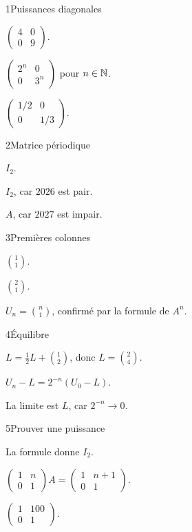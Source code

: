 \begin{corrige}{1}{Puissances diagonales}
\begin{questions}
\item $\begin{pmatrix}4&0\\0&9\end{pmatrix}$.
\item $\begin{pmatrix}2^n&0\\0&3^n\end{pmatrix}$ pour $n\in\mathbb{N}$.
\item $\begin{pmatrix}1/2&0\\0&1/3\end{pmatrix}$.
\end{questions}
\end{corrige}
\begin{corrige}{2}{Matrice périodique}
\begin{questions}
\item $I_2$.
\item $I_2$, car $2026$ est pair.
\item $A$, car $2027$ est impair.
\end{questions}
\end{corrige}
\begin{corrige}{3}{Premières colonnes}
\begin{questions}
\item $\binom11$.
\item $\binom21$.
\item $U_n=\binom n1$, confirmé par la formule de $A^n$.
\end{questions}
\end{corrige}
\begin{corrige}{4}{Équilibre}
\begin{questions}
\item $L=\tfrac12L+\binom12$, donc $L=\binom24$.
\item $U_n-L=2^{-n}(U_0-L)$.
\item La limite est $L$, car $2^{-n}\to0$.
\end{questions}
\end{corrige}
\begin{corrige}{5}{Prouver une puissance}
\begin{questions}
\item La formule donne $I_2$.
\item $\begin{pmatrix}1&n\\0&1\end{pmatrix}A=\begin{pmatrix}1&n+1\\0&1\end{pmatrix}$.
\item $\begin{pmatrix}1&100\\0&1\end{pmatrix}$.
\end{questions}
\end{corrige}
